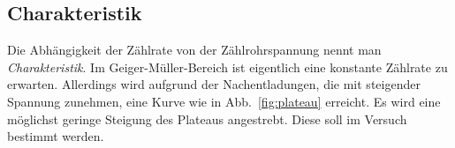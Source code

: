 \subsection{Charakteristik}
Die Abhängigkeit der Zählrate von der Zählrohrspannung nennt man \emph{Charakteristik}. Im Geiger-Müller-Bereich ist eigentlich eine konstante Zählrate zu erwarten. Allerdings wird aufgrund der Nachentladungen, die mit steigender Spannung zunehmen, eine Kurve wie in Abb.~\ref{fig:plateau} erreicht. Es wird eine möglichst geringe Steigung des Plateaus angestrebt. Diese soll im Versuch bestimmt werden.
